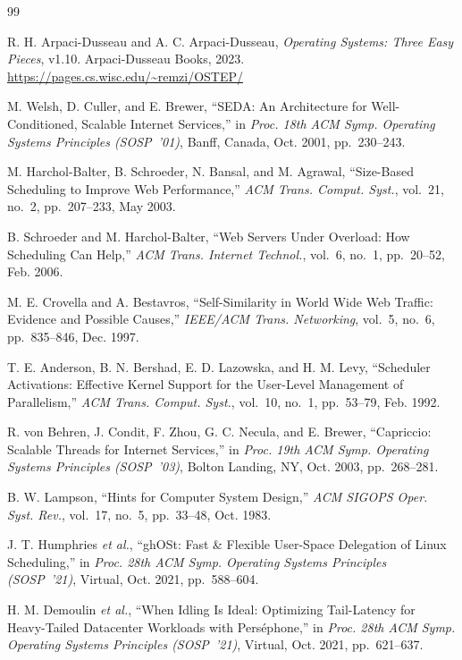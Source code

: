 \documentclass[conference]{IEEEtran}
\begin{document}
\begin{thebibliography}{99}

R. H. Arpaci-Dusseau and A. C. Arpaci-Dusseau,
\textit{Operating Systems: Three Easy Pieces}, v1.10.
Arpaci-Dusseau Books, 2023.
\url{https://pages.cs.wisc.edu/~remzi/OSTEP/}

M. Welsh, D. Culler, and E. Brewer,
``SEDA: An Architecture for Well-Conditioned, Scalable Internet Services,''
in \textit{Proc. 18th ACM Symp. Operating Systems Principles (SOSP~'01)},
Banff, Canada, Oct. 2001, pp.~230--243.

M. Harchol-Balter, B. Schroeder, N. Bansal, and M. Agrawal,
``Size-Based Scheduling to Improve Web Performance,''
\textit{ACM Trans. Comput. Syst.}, vol.~21, no.~2, pp.~207--233, May 2003.

B. Schroeder and M. Harchol-Balter,
``Web Servers Under Overload: How Scheduling Can Help,''
\textit{ACM Trans. Internet Technol.}, vol.~6, no.~1, pp.~20--52, Feb. 2006.

M. E. Crovella and A. Bestavros,
``Self-Similarity in World Wide Web Traffic: Evidence and Possible Causes,''
\textit{IEEE/ACM Trans. Networking}, vol.~5, no.~6, pp.~835--846, Dec. 1997.

T. E. Anderson, B. N. Bershad, E. D. Lazowska, and H. M. Levy,
``Scheduler Activations: Effective Kernel Support for the User-Level
Management of Parallelism,''
\textit{ACM Trans. Comput. Syst.}, vol.~10, no.~1, pp.~53--79, Feb. 1992.

R. von Behren, J. Condit, F. Zhou, G. C. Necula, and E. Brewer,
``Capriccio: Scalable Threads for Internet Services,''
in \textit{Proc. 19th ACM Symp. Operating Systems Principles (SOSP~'03)},
Bolton Landing, NY, Oct. 2003, pp.~268--281.

B. W. Lampson,
``Hints for Computer System Design,''
\textit{ACM SIGOPS Oper. Syst. Rev.}, vol.~17, no.~5, pp.~33--48, Oct. 1983.

J. T. Humphries \textit{et al.},
``ghOSt: Fast \& Flexible User-Space Delegation of Linux Scheduling,''
in \textit{Proc. 28th ACM Symp. Operating Systems Principles (SOSP~'21)},
Virtual, Oct. 2021, pp.~588--604.

H. M. Demoulin \textit{et al.},
``When Idling Is Ideal: Optimizing Tail-Latency for Heavy-Tailed Datacenter
Workloads with Perséphone,''
in \textit{Proc. 28th ACM Symp. Operating Systems Principles (SOSP~'21)},
Virtual, Oct. 2021, pp.~621--637.


\end{thebibliography}
\end{document}
